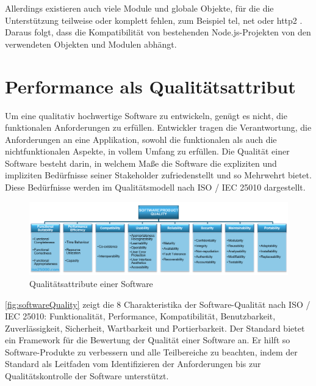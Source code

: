 \noindent
Allerdings existieren auch viele Module und globale Objekte, für die die Unterstützung teilweise oder komplett fehlen, zum Beispiel \glqq tel\grqq{}, \glqq net\grqq{} oder \glqq http2\grqq{} \cite{OvenSh.2023c}. Daraus folgt, dass die Kompatibilität von bestehenden Node.js-Projekten von den verwendeten Objekten und Modulen abhängt.

\section{Performance als Qualitätsattribut} \label{sec:foundations-Performance}
Um eine qualitativ hochwertige Software zu entwickeln, genügt es nicht, die funktionalen Anforderungen zu erfüllen. Entwickler tragen die Verantwortung, die Anforderungen an eine Applikation, sowohl die funktionalen als auch die nichtfunktionalen Aspekte, in vollem Umfang zu erfüllen. Die Qualität einer Software besteht darin, in welchem Maße die Software die expliziten und impliziten Bedürfnisse seiner Stakeholder zufriedenstellt und so Mehrwehrt bietet. Diese Bedürfnisse werden im Qualitätsmodell nach ISO / IEC 25010 dargestellt.\cite{.2022}\\

\begin{figure}[h]
	\centering
	\includegraphics[width=\linewidth]{./images/iso25010.png}
	\caption[Qualitätsattribute einer Software]{Qualitätsattribute einer Software \cite{.2022}}
	\label{fig:softwareQuality}
\end{figure}

\noindent
\autoref{fig:softwareQuality} zeigt die 8 Charakteristika der Software-Qualität nach ISO / IEC 25010: Funktionalität, Performance, Kompatibilität, Benutzbarkeit, Zuverlässigkeit, Sicherheit, Wartbarkeit und Portierbarkeit. Der Standard bietet ein Framework für die Bewertung der Qualität einer Software an. Er hilft so Software-Produkte zu verbessern und alle Teilbereiche zu beachten, indem der Standard als Leitfaden vom Identifizieren der Anforderungen bis zur Qualitätskontrolle der Software unterstützt.\cite{ISOIEC.}\\


